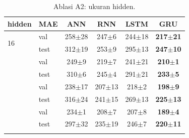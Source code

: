 \begin{table}[t]
\centering
\scriptsize
\caption{Ablasi A2: ukuran hidden.}
\label{tab:A2}
\setlength{\tabcolsep}{3pt}
\begin{tabular}{@{}llcccc@{}}
\toprule
hidden & MAE & ANN & RNN & LSTM & GRU \\
\midrule
\multirow{2}{*}{16} & val & 258$\pm$28 & 247$\pm$6 & 244$\pm$18 & \textbf{217$\pm$21} \\
 & test & 312$\pm$19 & 253$\pm$9 & 295$\pm$13 & \textbf{247$\pm$10} \\
\addlinespace[1pt]
\multirow{2}{*}{32} & val & 249$\pm$9 & 219$\pm$7 & 241$\pm$21 & \textbf{210$\pm$1} \\
 & test & 310$\pm$6 & 245$\pm$4 & 291$\pm$21 & \textbf{233$\pm$5} \\
\addlinespace[1pt]
\multirow{2}{*}{64} & val & 238$\pm$17 & 207$\pm$13 & 218$\pm$2 & \textbf{198$\pm$9} \\
 & test & 316$\pm$24 & 241$\pm$15 & 269$\pm$13 & \textbf{225$\pm$13} \\
\addlinespace[1pt]
\multirow{2}{*}{128} & val & 234$\pm$1 & 208$\pm$7 & 207$\pm$8 & \textbf{189$\pm$4} \\
 & test & 297$\pm$32 & 235$\pm$19 & 246$\pm$7 & \textbf{220$\pm$11} \\
\addlinespace[1pt]
\bottomrule
\end{tabular}
\end{table}